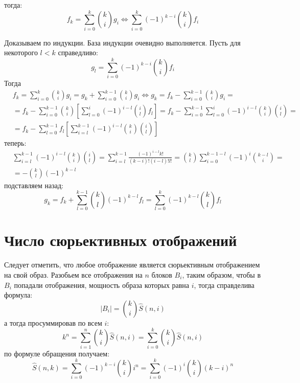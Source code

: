 тогда:
\begin{equation}
	f_k = \sum_{i=0}^k\binom{k}{i}g_i \Leftrightarrow \sum_{i=0}^k \left(-1\right)^{k-i}\binom{k}{i}f_i
\end{equation}
\begin{Proof}
Доказываем по индукции. База индукции очевидно выполняется. Пусть для некоторого $l < k$ справедливо:
\[
	g_l = \sum_{i=0}^k\left(-1\right)^{k-i}\binom{k}{i}f_i
\]
Тогда
\[
	\begin{split}
		& f_k = \sum_{i=0}^k\binom{k}{i}g_i = g_k + \sum_{i=0}^{k-1} \binom{k}{i}g_i \Leftrightarrow g_k = f_k - \sum_{i=0}^{k-1}\binom{k}{i}g_i = \\
		& = f_k - \sum_{i=0}^{k-1}\binom{k}{i}\left[\sum_{l=0}^i \left(-1\right)^{i-l}\binom{i}{l}f_l\right] = f_k - \sum_{i=0}^{k-1}\sum_{l=0}^i \left(-1\right)^{i-l} \binom{k}{i}\binom{i}{l} = \\
		& = f_k - \sum_{l=0}^{k-1}f_l \left[\sum_{i=l}^{k-1}\left(-1\right)^{i-l}\binom{k}{i}\binom{i}{l}\right]
	\end{split}
\]
теперь:
\[
	\begin{split}
		& \sum_{i=l}^{k-1}\left(-1\right)^{i-l}\binom{k}{i}\binom{i}{l} = \sum_{i=l}^{k-1}\frac{\left(-1\right)^{i-l}k!}{\left(k-i\right)!\left(i-l\right)!l!} = \binom{k}{l}\sum_{i=0}^{k-1-l}\left(-1\right)^i\binom{k-l}{i} = \\
		& = - \binom{k}{l}\left(-1\right)^{k-l}
	\end{split}
\]
подставляем назад:
\[
	g_k = f_k + \sum_{l=0}^{k-1} \binom{k}{l}\left(-1\right)^{k-l}f_l = \sum_{l=0}^k \left(-1\right)^{k-l}\binom{k}{l}f_l
\]
\end{Proof}

\section{Число сюрьективных отображений}

Следует отметить, что любое отображение является сюрьективным отображением на свой образ. Разобьем все отображения на $n$ блоков $B_i$, таким образом, чтобы в $B_i$ попадали отображения, мощность образа которых равна $i$, тогда справделива формула:
\begin{equation}
\left|B_i\right| = \binom{k}{i}\hat S\left(n,i\right)
\end{equation}
а тогда просуммировав по всем $i$:
\begin{equation}
k^n = \sum_{i=1}^n\binom{k}{i}\hat S\left(n,i\right) = \sum_{i=0}^k\binom{k}{i} \hat S\left(n,i\right)
\end{equation}
по формуле обращения получаем:
\begin{equation}
	\hat S\left(n,k\right) = \sum_{i=0}^k\left(-1\right)^{k-i}\binom{k}{i}i^n = \sum_{i=0}^k\left(-1\right)^i\binom{k}{i}\left(k-i\right)^n
\end{equation}
